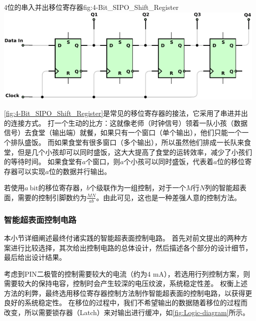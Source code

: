 \documentclass[supercite]{HustGraduPaper}
\begin{document}
\begin{generalfig}[htb]{4位的串入并出移位寄存器}{fig:4-Bit_SIPO_Shift_Register}
	\includegraphics[width=0.8\linewidth]{Figures/4-Bit_SIPO_Shift_Register.pdf}
\end{generalfig}

\autoref{fig:4-Bit_SIPO_Shift_Register}是常见的移位寄存器的接法，它采用了串进并出的连接方式。
打一个生动的比方：这就像老师（时钟信号）领着一队小孩（数据信号）去食堂（输出端）就餐，如果只有一个窗口（单个输出），他们只能一个一个排队盛饭。
而如果食堂有很多窗口（多个输出），所以虽然他们排成一长队来食堂，但是几个小孩却可以同时盛饭，这大大提高了食堂的运转效率，减少了小孩们的等待时间。
如果食堂有$a$个窗口，则$a$个小孩可以同时盛饭，代表着$a$位的移位寄存器可以实现$a$位的数据并行输出。

若使用$a~\mathrm{bit}$的移位寄存器，$b$个级联作为一组控制，对于一个$M$行$N$列的智能超表面，需要的控制引脚数约为$\frac{MN}{ab}$。由此可见，这也是一种差强人意的控制方法。

\subsubsection{智能超表面控制电路}

本小节详细阐述最终付诸实践的智能超表面控制电路。
首先对前文提出的两种方案进行比较选择，其次给出控制电路的总体设计，然后描述各个部分的设计细节，最后给出设计结果。


考虑到PIN二极管的控制需要较大的电流（约为4 mA），若选用行列控制方案，则需要较大的保持电容，控制时会产生较深的电压纹波，系统稳定性差。
权衡上述方法的利弊，最终选用移位寄存器控制方法制作智能超表面的控制电路，以获得更良好的系统稳定性。
在移位的过程中，我们不希望输出的数据随着移位的过程而改变，所以需要锁存器（Latch）来对输出进行缓冲，如\autoref{fig:Logic-diagram}所示。
\end{document}
